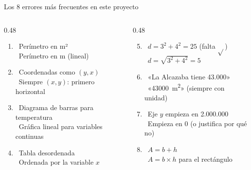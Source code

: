 \documentclass[aspectratio=169, 10pt, spanish]{beamer}
\begin{document}

\begin{frame}{Los 8 errores más frecuentes en este proyecto}
  \begin{columns}[T]
    \begin{column}{0.48\textwidth}
      \begin{enumerate}
        \item \incorrecto\ Perímetro en m²\\
              \correcto\ Perímetro en m (lineal)
        \vspace{4pt}
        \item \incorrecto\ Coordenadas como $(y,x)$\\
              \correcto\ Siempre $(x,y)$: primero horizontal
        \vspace{4pt}
        \item \incorrecto\ Diagrama de barras para temperatura\\
              \correcto\ Gráfica lineal para variables continuas
        \vspace{4pt}
        \item \incorrecto\ Tabla desordenada\\
              \correcto\ Ordenada por la variable $x$
      \end{enumerate}
    \end{column}
    \begin{column}{0.48\textwidth}
      \begin{enumerate}\setcounter{enumi}{4}
        \item \incorrecto\ $d = 3^2 + 4^2 = 25$ (falta $\sqrt{}$)\\
              \correcto\ $d = \sqrt{3^2+4^2} = 5$
        \vspace{4pt}
        \item \incorrecto\ «La Alcazaba tiene 43.000»\\
              \correcto\ «\SI{43000}{m^2}» (siempre con unidad)
        \vspace{4pt}
        \item \incorrecto\ Eje $y$ empieza en 2.000.000\\
              \correcto\ Empieza en 0 (o justifica por qué no)
        \vspace{4pt}
        \item \incorrecto\ $A = b + h$\\
              \correcto\ $A = b \times h$ para el rectángulo
      \end{enumerate}
    \end{column}
  \end{columns}
\end{frame}
\end{document}
